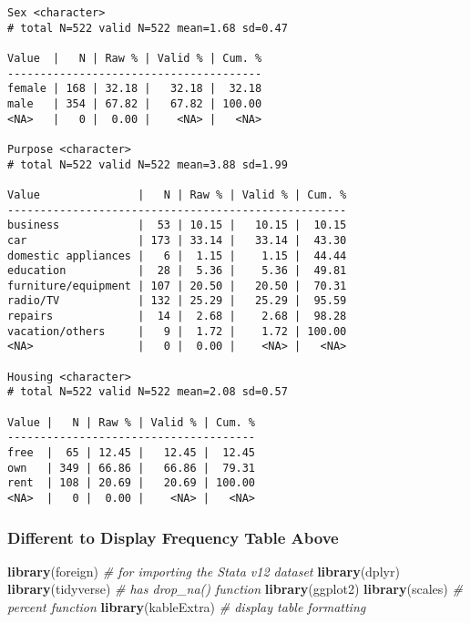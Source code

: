 \documentclass[
]{article}
\newenvironment{Shaded}{\begin{snugshade}}{\end{snugshade}}
\newcommand{\CommentTok}[1]{\textcolor[rgb]{0.56,0.35,0.01}{\textit{#1}}}
\newcommand{\FunctionTok}[1]{\textcolor[rgb]{0.13,0.29,0.53}{\textbf{#1}}}
\newcommand{\NormalTok}[1]{#1}
\begin{document}
\begin{verbatim}
Sex <character> 
# total N=522 valid N=522 mean=1.68 sd=0.47

Value  |   N | Raw % | Valid % | Cum. %
---------------------------------------
female | 168 | 32.18 |   32.18 |  32.18
male   | 354 | 67.82 |   67.82 | 100.00
<NA>   |   0 |  0.00 |    <NA> |   <NA>

Purpose <character> 
# total N=522 valid N=522 mean=3.88 sd=1.99

Value               |   N | Raw % | Valid % | Cum. %
----------------------------------------------------
business            |  53 | 10.15 |   10.15 |  10.15
car                 | 173 | 33.14 |   33.14 |  43.30
domestic appliances |   6 |  1.15 |    1.15 |  44.44
education           |  28 |  5.36 |    5.36 |  49.81
furniture/equipment | 107 | 20.50 |   20.50 |  70.31
radio/TV            | 132 | 25.29 |   25.29 |  95.59
repairs             |  14 |  2.68 |    2.68 |  98.28
vacation/others     |   9 |  1.72 |    1.72 | 100.00
<NA>                |   0 |  0.00 |    <NA> |   <NA>

Housing <character> 
# total N=522 valid N=522 mean=2.08 sd=0.57

Value |   N | Raw % | Valid % | Cum. %
--------------------------------------
free  |  65 | 12.45 |   12.45 |  12.45
own   | 349 | 66.86 |   66.86 |  79.31
rent  | 108 | 20.69 |   20.69 | 100.00
<NA>  |   0 |  0.00 |    <NA> |   <NA>
\end{verbatim}

\hypertarget{different-to-display-frequency-table-above}{%
\subsubsection{Different to Display Frequency Table
Above}\label{different-to-display-frequency-table-above}}

\begin{Shaded}
\begin{Highlighting}[]
\FunctionTok{library}\NormalTok{(foreign) }\CommentTok{\# for importing the Stata v12 dataset}
\FunctionTok{library}\NormalTok{(dplyr)}
\FunctionTok{library}\NormalTok{(tidyverse) }\CommentTok{\# has drop\_na() function}
\FunctionTok{library}\NormalTok{(ggplot2)}
\FunctionTok{library}\NormalTok{(scales) }\CommentTok{\# percent function}
\FunctionTok{library}\NormalTok{(kableExtra) }\CommentTok{\# display table formatting}
\end{Highlighting}
\end{Shaded}
\end{document}
